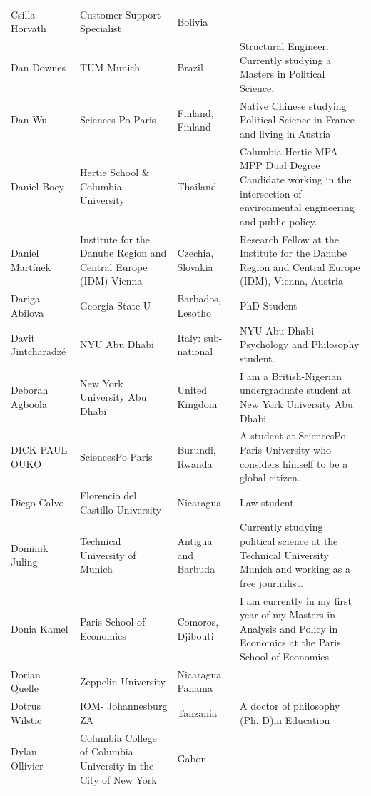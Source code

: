 \documentclass[]{article}
\begin{document}
\begin{longtable}{l>{\raggedright\arraybackslash}p{2cm}>{\raggedright\arraybackslash}p{2cm}>{\raggedright\arraybackslash}p{3cm}}
Csilla Horvath & Customer Support Specialist & Bolivia & \\
\rowcolor{gray!6}  Dan Downes & TUM Munich & Brazil & Structural Engineer. Currently studying a Masters in Political Science.\\
Dan Wu & Sciences Po Paris & Finland, Finland & Native Chinese studying Political Science in France and living in Austria\\
\rowcolor{gray!6}  Daniel Boey & Hertie School \& Columbia University & Thailand & Columbia-Hertie MPA-MPP Dual Degree Candidate working in the intersection of environmental engineering and public policy.\\
\addlinespace
Daniel Martínek & Institute for the Danube Region and Central Europe (IDM) Vienna & Czechia, Slovakia & Research Fellow at the Institute for the Danube Region and Central Europe (IDM), Vienna, Austria\\
\rowcolor{gray!6}  Dariga Abilova & Georgia State U & Barbados, Lesotho & PhD Student\\
Davit Jintcharadzé & NYU Abu Dhabi & Italy: sub-national & NYU Abu Dhabi Psychology and Philosophy student.\\
\rowcolor{gray!6}  Deborah Agboola & New York University Abu Dhabi & United Kingdom & I am a British-Nigerian undergraduate student at New York University Abu Dhabi\\
DICK PAUL OUKO & SciencesPo Paris & Burundi, Rwanda & A student at SciencesPo Paris University who considers himself to be a global citizen.\\
\addlinespace
\rowcolor{gray!6}  Diego Calvo & Florencio del Castillo University & Nicaragua & Law student\\
Dominik Juling & Technical University of Munich & Antigua and Barbuda & Currently studying political science at the Technical University Munich and working as a free journalist.\\
\rowcolor{gray!6}  Donia Kamel & Paris School of Economics & Comoros, Djibouti & I am currently in my first year of my Masters in Analysis and Policy in Economics at the Paris School of Economics\\
Dorian Quelle & Zeppelin University & Nicaragua, Panama & \\
\rowcolor{gray!6}  Dotrus Wilstic & IOM- Johannesburg ZA & Tanzania & A doctor of philosophy (Ph. D)in Education\\
\addlinespace
Dylan Ollivier & Columbia College of Columbia University in the City of New York & Gabon & \\

\end{longtable}
\end{document}
